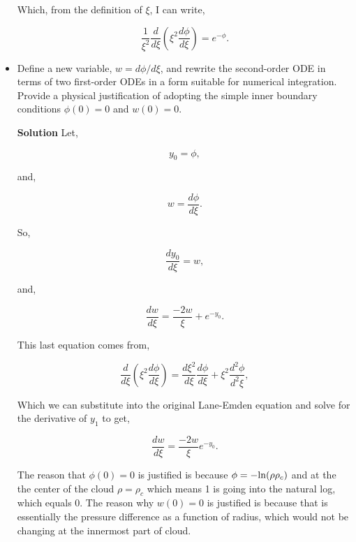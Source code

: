 \documentclass[12pt]{article}
\begin{document}
\begin{itemize}
Which, from the definition of $\xi$, I can write, 


\begin{equation}
\frac{1}{\xi^2}\frac{d}{d\xi}\left(\xi^2\frac{d\phi}{d\xi} \right) = e^{-\phi}.
\end{equation}

\item Define a new variable, $w = d\phi/d\xi$, and rewrite the second-order ODE in terms of two first-order ODEs in a form suitable for numerical integration. Provide a physical justification of adopting the simple inner boundary conditions $\phi(0) = 0$ and $w(0) = 0$.

{\bf Solution}
Let, 

\begin{equation}
y_0 = \phi, 
\end{equation}

\noindent and,

\begin{equation}
w = \frac{d\phi}{d\xi}.
\end{equation}

\noindent So, 

\begin{equation}
\frac{d y_0}{d\xi} = w,
\end{equation}

\noindent and,

\begin{equation}
\frac{d w}{d\xi} = \frac{-2w}{\xi} + e^{-y_0}.
\end{equation}

\noindent This last equation comes from, 

\begin{equation}
\frac{d}{d\xi}\left ( \xi^2 \frac{d\phi}{d\xi} \right) = \frac{d\xi^2}{d\xi}\frac{d\phi}{d\xi} + \xi^2\frac{d^2\phi}{d^2\xi}, 
\end{equation}

\noindent Which we can substitute into the original Lane-Emden equation and solve for the derivative of $y_1$ to get,

\begin{equation}
\frac{dw}{d\xi} = \frac{-2w}{\xi} e^{-y_0}.
\end{equation}

The reason that  $\phi(0) = 0$ is justified is because $\phi = -{\rm ln}(\rho\rho_c)$ and at the the center of the cloud $\rho = \rho_c$ which means 1 is going into the natural log, which equals 0. The reason why $w(0) = 0$ is justified is because that is essentially the pressure difference as a function of radius, which would not be changing at the innermost part of cloud.



\end{itemize}
\end{document}
